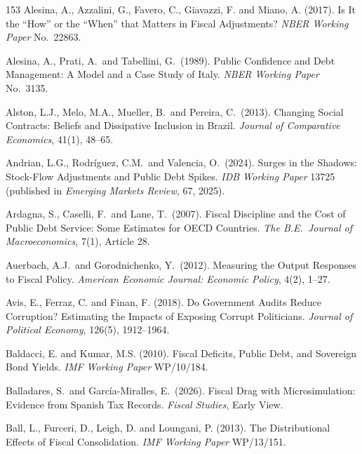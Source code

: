 \documentclass[11pt,a4paper]{article}
\begin{document}
\begin{thebibliography}{153}
 Alesina, A., Azzalini, G., Favero, C., Giavazzi, F. and Miano, A. (2017). Is It the ``How'' or the ``When'' that Matters in Fiscal Adjustments? \textit{NBER Working Paper} No.\ 22863.

 Alesina, A., Prati, A.\ and Tabellini, G.\ (1989). Public Confidence and Debt Management: A Model and a Case Study of Italy. \textit{NBER Working Paper} No.\ 3135.

 Alston, L.J., Melo, M.A., Mueller, B.\ and Pereira, C.\ (2013). Changing Social Contracts: Beliefs and Dissipative Inclusion in Brazil. \textit{Journal of Comparative Economics}, 41(1), 48--65.

 Andrian, L.G., Rodr\'iguez, C.M.\ and Valencia, O.\ (2024). Surges in the Shadows: Stock-Flow Adjustments and Public Debt Spikes. \textit{IDB Working Paper} 13725 (published in \textit{Emerging Markets Review}, 67, 2025).

 Ardagna, S., Caselli, F.\ and Lane, T.\ (2007). Fiscal Discipline and the Cost of Public Debt Service: Some Estimates for OECD Countries. \textit{The B.E.\ Journal of Macroeconomics}, 7(1), Article 28.

 Auerbach, A.J.\ and Gorodnichenko, Y.\ (2012). Measuring the Output Responses to Fiscal Policy. \textit{American Economic Journal: Economic Policy}, 4(2), 1--27.

 Avis, E., Ferraz, C. and Finan, F. (2018). Do Government Audits Reduce Corruption? Estimating the Impacts of Exposing Corrupt Politicians. \textit{Journal of Political Economy}, 126(5), 1912--1964.

 Baldacci, E. and Kumar, M.S. (2010). Fiscal Deficits, Public Debt, and Sovereign Bond Yields. \textit{IMF Working Paper} WP/10/184.

 Balladares, S.\ and Garc\'ia-Miralles, E.\ (2026). Fiscal Drag with Microsimulation: Evidence from Spanish Tax Records. \textit{Fiscal Studies}, Early View.

 Ball, L., Furceri, D., Leigh, D. and Loungani, P. (2013). The Distributional Effects of Fiscal Consolidation. \textit{IMF Working Paper} WP/13/151.


\end{thebibliography}
\end{document}
